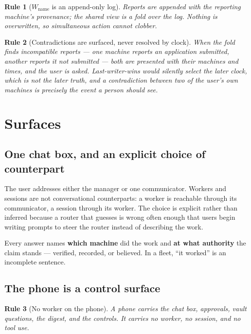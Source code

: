 \documentclass[11pt]{article}
\newtheorem{drule}{Rule}
\begin{document}
\begin{drule}[$W_{\text{name}}$ is an append-only log]
\label{rule:append}
Reports are appended with the reporting machine's provenance; the shared view is a fold over the log. Nothing is overwritten, so simultaneous action cannot clobber.
\end{drule}

\begin{drule}[Contradictions are surfaced, never resolved by clock]
\label{rule:contradiction}
When the fold finds incompatible reports --- one machine reports an application submitted, another reports it not submitted --- both are presented with their machines and times, and the user is asked. Last-writer-wins would silently select the later \emph{clock}, which is not the later \emph{truth}, and a contradiction between two of the user's own machines is precisely the event a person should see.
\end{drule}

\section{Surfaces}
\label{sec:surfaces}

\subsection{One chat box, and an explicit choice of counterpart}

The user addresses either the manager or one communicator. Workers and sessions are not conversational counterparts: a worker is reachable through its communicator, a session through its worker. The choice is explicit rather than inferred because a router that guesses is wrong often enough that users begin writing prompts to steer the router instead of describing the work.

Every answer names \textbf{which machine} did the work and \textbf{at what authority} the claim stands --- verified, recorded, or believed. In a fleet, ``it worked'' is an incomplete sentence.

\subsection{The phone is a control surface}

\begin{drule}[No worker on the phone]
\label{rule:phone}
A phone carries the chat box, approvals, vault questions, the digest, and the controls. It carries no worker, no session, and no tool use.
\end{drule}
\end{document}
